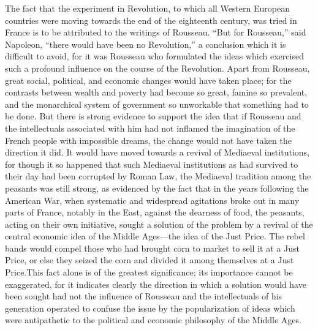 \documentclass{book}
\begin{document}
The fact that the experiment in Revolution, to which all Western European countries were moving towards the end of the eighteenth century, was tried in France is to be attributed to the writings of Rousseau. “But for Rousseau,” said Napoleon, “there would have been no Revolution,” a conclusion which it is difficult to avoid, for it was Rousseau who formulated the ideas which exercised such a profound influence on the course of the Revolution. Apart from Rousseau, great social, political, and economic changes would have taken place; for the contrasts between wealth and poverty had become so great, famine so prevalent, and the monarchical system of government so unworkable that something had to be done. But there is strong evidence to support the idea that if Rousseau and the intellectuals associated with him had not inflamed the imagination of the French people with impossible dreams, the change would not have taken the direction it did. It would have moved towards a revival of Mediaeval institutions, for though it so happened that such Mediaeval institutions as had survived to their day had been corrupted by Roman Law, the Mediaeval tradition among the peasants was still strong, as evidenced by the fact that in the years following the American War, when systematic and widespread agitations broke out in many parts of France, notably in the East, against the dearness of food, the peasants, acting on their own initiative, sought a solution of the problem by a revival of the central economic idea of the Middle Ages—the idea of the Just Price. The rebel bands would compel those who had brought corn to market to sell it at a Just Price, or else they seized the corn and divided it among themselves at a Just Price.\footnotemark[2] This fact alone is of the greatest significance; its importance cannot be exaggerated, for it indicates clearly the direction in which a solution would have been sought had not the influence of Rousseau and the intellectuals of his generation operated to confuse the issue by the popularization of ideas which were antipathetic to the political and economic philosophy of the Middle Ages.
\end{document}
